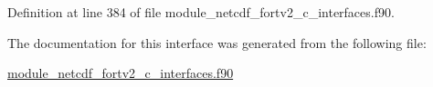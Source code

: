 Definition at line 384 of file module\+\_\+netcdf\+\_\+fortv2\+\_\+c\+\_\+interfaces.\+f90.



The documentation for this interface was generated from the following file\+:\begin{DoxyCompactItemize}
\item 
\hyperlink{module__netcdf__fortv2__c__interfaces_8f90}{module\+\_\+netcdf\+\_\+fortv2\+\_\+c\+\_\+interfaces.\+f90}\end{DoxyCompactItemize}
